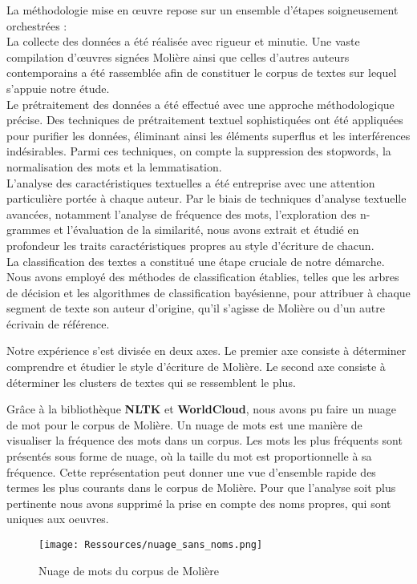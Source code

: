 \vspace{\baselineskip}
\hspace{0,5cm}La méthodologie mise en œuvre repose sur un ensemble d'étapes
soigneusement orchestrées : \\La collecte des données a été réalisée avec
rigueur et minutie. Une vaste compilation d'œuvres signées Molière ainsi que
celles d'autres auteurs contemporains a été rassemblée afin de constituer le
corpus de textes sur lequel s'appuie notre étude.  \\Le prétraitement des
données a été effectué avec une approche méthodologique précise. Des techniques
de prétraitement textuel sophistiquées ont été appliquées pour purifier les
données, éliminant ainsi les éléments superflus et les interférences
indésirables. Parmi ces techniques, on compte la suppression des stopwords, la
normalisation des mots et la lemmatisation.  \\L'analyse des caractéristiques
textuelles a été entreprise avec une attention particulière portée à chaque
auteur. Par le biais de techniques d'analyse textuelle avancées, notamment
l'analyse de fréquence des mots, l'exploration des n-grammes et l'évaluation de
la similarité, nous avons extrait et étudié en profondeur les traits
caractéristiques propres au style d'écriture de chacun.  \\La classification des
textes a constitué une étape cruciale de notre démarche.  Nous avons employé des
méthodes de classification établies, telles que les arbres de décision et les
algorithmes de classification bayésienne, pour attribuer à chaque segment de
texte son auteur d'origine, qu'il s'agisse de Molière ou d'un autre écrivain de
référence. 

\hspace{0,5cm}Notre expérience s'est divisée en deux axes. Le premier axe
consiste à déterminer comprendre et étudier le style d'écriture de Molière. Le
second axe consiste à déterminer les clusters de textes qui se ressemblent le
plus.

\hspace{0,5cm}Grâce à la bibliothèque \textbf{NLTK} et \textbf{WorldCloud}, nous
avons pu faire un nuage de mot pour le corpus de Molière. Un nuage de mots est
une manière de visualiser la fréquence des mots dans un corpus. Les mots
les plus fréquents sont présentés sous forme de nuage, où la taille du mot est
proportionnelle à sa fréquence. Cette représentation peut donner une vue
d'ensemble rapide des termes les plus courants dans le corpus de Molière. Pour
que l'analyse soit plus pertinente nous avons supprimé la prise en compte des
noms propres, qui sont uniques aux oeuvres.

\begin{figure}[htbp]
    \centering
    \texttt{[image: Ressources/nuage\_sans\_noms.png]}
    \caption{Nuage de mots du corpus de Molière}
    \label{fig:images}
  \end{figure}

